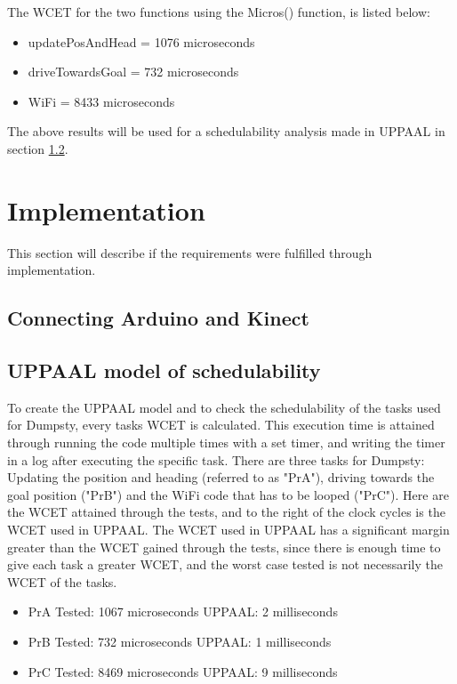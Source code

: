 The WCET for the two functions using the Micros() function, is listed below:
\begin{itemize}
	\item updatePosAndHead = 1076 microseconds
	\item driveTowardsGoal = 732 microseconds
	\item WiFi = 8433 microseconds
\end{itemize}

The above results will be used for a schedulability analysis made in UPPAAL in section \ref{sec:i3UPPAAL model}. 
\section{Implementation}
\label{sec:i3Implementation}
This section will describe if the requirements were fulfilled through implementation.

\subsection{Connecting Arduino and Kinect}
\label{sec:i3Connecting Arduino and Kinect implementation}

\subsection{UPPAAL model of schedulability}
\label{sec:i3UPPAAL model}
To create the UPPAAL model and to check the schedulability of the tasks used for Dumpsty, every tasks WCET is calculated. This execution time is attained through running the code multiple times with a set timer, and writing the timer in a log after executing the specific task. There are three tasks for Dumpsty: Updating the position and heading (referred to as "PrA"), driving towards the goal position ("PrB") and the WiFi code that has to be looped ("PrC"). Here are the WCET attained through the tests, and to the right of the clock cycles is the WCET used in UPPAAL. The WCET used in UPPAAL has a significant margin greater than the WCET gained through the tests, since there is enough time to give each task a greater WCET, and the worst case tested is not necessarily the WCET of the tasks. 

\begin{itemize}
	\item PrA \tab Tested: 1067 microseconds \tab UPPAAL: 2 milliseconds
	\item PrB \tab Tested: 732  microseconds \tab UPPAAL: 1 milliseconds
	\item PrC \tab	Tested: 8469 microseconds \tab UPPAAL: 9 milliseconds
\end{itemize}

